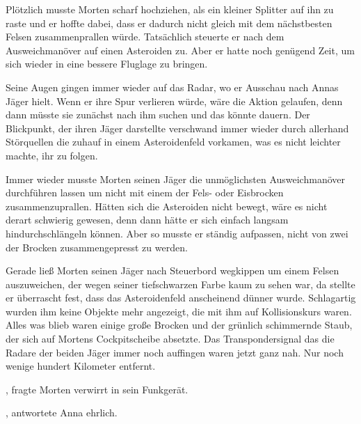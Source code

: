 \par

Plötzlich musste Morten scharf hochziehen, als ein kleiner Splitter auf ihn zu raste und er hoffte dabei, dass er dadurch nicht gleich mit dem nächstbesten Felsen zusammenprallen würde. Tatsächlich steuerte er nach dem Ausweichmanöver auf einen Asteroiden zu. Aber er hatte noch genügend Zeit, um sich wieder in eine bessere Fluglage zu bringen.

\par

Seine Augen gingen immer wieder auf das Radar, wo er Ausschau nach Annas Jäger hielt. Wenn er ihre Spur verlieren würde, wäre die Aktion gelaufen, denn dann müsste sie zunächst nach ihm suchen und das könnte dauern. Der Blickpunkt, der ihren Jäger darstellte verschwand immer wieder durch allerhand Störquellen die zuhauf in einem Asteroidenfeld vorkamen, was es nicht leichter machte, ihr zu folgen.

\par

Immer wieder musste Morten seinen Jäger die unmöglichsten Ausweichmanöver durchführen lassen um nicht mit einem der Fels- oder Eisbrocken zusammenzuprallen. Hätten sich die Asteroiden nicht bewegt, wäre es nicht derart schwierig gewesen, denn dann hätte er sich einfach langsam hindurchschlängeln können. Aber so musste er ständig aufpassen, nicht von zwei der Brocken zusammengepresst zu werden.

\par

Gerade ließ Morten seinen Jäger nach Steuerbord wegkippen um einem Felsen auszuweichen, der wegen seiner tiefschwarzen Farbe kaum zu sehen war, da stellte er überrascht fest, dass das Asteroidenfeld anscheinend dünner wurde. Schlagartig wurden ihm keine Objekte mehr angezeigt, die mit ihm auf Kollisionskurs waren. Alles was blieb waren einige große Brocken und der grünlich schimmernde Staub, der sich auf Mortens Cockpitscheibe absetzte. Das Transpondersignal das die Radare der beiden Jäger immer noch auffingen waren jetzt ganz nah. Nur noch wenige hundert Kilometer entfernt.

\par

, fragte Morten verwirrt in sein Funkgerät.

\par

, antwortete Anna ehrlich. 

